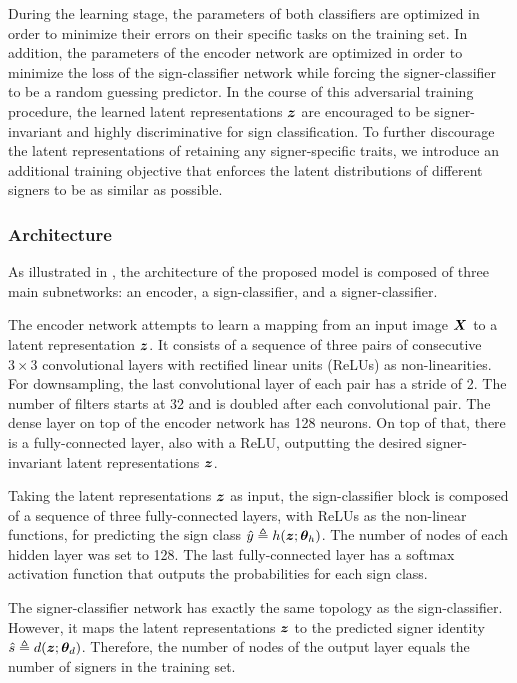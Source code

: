 During the learning stage, the parameters of both classifiers are optimized in order to minimize their errors on their specific tasks on the training set. In addition, the parameters of the encoder network are optimized in order to minimize the loss of the sign-classifier network while forcing the signer-classifier to be a random guessing predictor. In the course of this adversarial training procedure, the learned latent representations ${\bm{z}}$ are encouraged to be signer-invariant and highly discriminative for sign classification. To further discourage the latent representations of retaining any signer-specific traits, we introduce an additional training objective that enforces the latent distributions of different signers to be as similar as possible.

\subsubsection{Architecture}
As illustrated in , the architecture of the proposed model is composed of three main subnetworks: an encoder, a sign-classifier, and a signer-classifier.

The encoder network attempts to learn a mapping from an input image ${\bm{X}}$ to a latent representation ${\bm{z}}$. It consists of a sequence of three pairs of consecutive $3\times 3$ convolutional layers with rectified  linear  units (ReLUs) as non-linearities. For downsampling, the last convolutional layer of each pair has a stride of 2. The number of filters starts at 32 and is doubled after each convolutional pair. The dense layer on top of the encoder network has 128 neurons. On top of that, there is a fully-connected layer, also with a ReLU, outputting the desired signer-invariant latent representations ${\bm{z}}$.

Taking the latent representations ${\bm{z}}$ as input, the sign-classifier block is composed of a sequence of three fully-connected layers, with ReLUs as the non-linear functions, for predicting the sign class $\hat{y} \triangleq h({\bm{z}}; {\bm{\theta}}_h)$. The number of nodes of each hidden layer was set to 128. The last fully-connected layer has a softmax activation function that outputs the probabilities for each sign class.

The signer-classifier network has exactly the same topology as the sign-classifier. However, it maps the latent representations ${\bm{z}}$ to the predicted signer identity $\hat{s} \triangleq d({\bm{z}}; {\bm{\theta}}_d)$. Therefore, the number of nodes of the output layer equals the number of signers in the training set.


